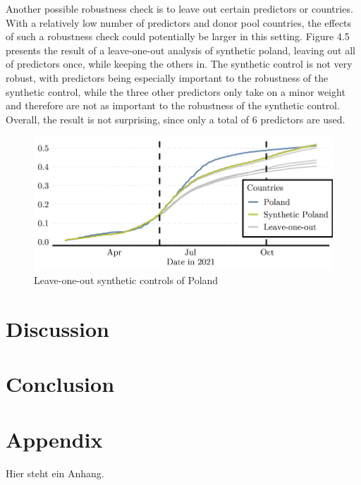 \documentclass{scrbook}
\begin{document}
Another possible robustness check is to leave out certain predictors or
countries. With a relatively low number of predictors and donor pool
countries, the effects of such a robustness check could potentially be
larger in this setting. Figure 4.5 presents the result of a
leave-one-out analysis of synthetic poland, leaving out all of
predictors once, while keeping the others in. The synthetic control is
not very robust, with predictors being especially important to the
robustness of the synthetic control, while the three other predictors
only take on a minor weight and therefore are not as important to the
robustness of the synthetic control. Overall, the result is not
surprising, since only a total of 6 predictors are used.

\begin{figure}[h]
\caption{Leave-one-out synthetic controls of Poland}

\begin{center}\includegraphics{bachelor_thesis_files/figure-latex/unnamed-chunk-6-1} \end{center}
\end{figure}

\chapter{Discussion}

\chapter{Conclusion}


 
\backmatter
 
\renewcommand\refname{References}
\printbibliography[title=References]

\chapter{Appendix}
Hier steht ein Anhang.
\end{document}
